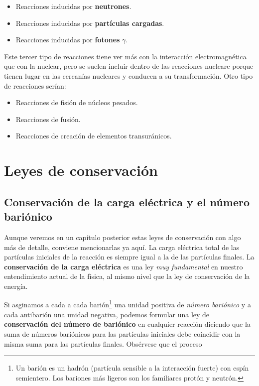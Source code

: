 \begin{itemize}
	\item Reacciones inducidas por \textbf{neutrones}.
	\item Reacciones inducidas por \textbf{partículas cargadas}.
	\item Reacciones inducidas por \textbf{fotones} $\gamma$.	
\end{itemize}
Este tercer tipo de reacciones tiene ver más con la interacción electromagnética que con la nuclear, pero se suelen incluir dentro de las reacciones nucleare porque tienen lugar en las cercanías nucleares y conducen a su transformación. Otro tipo de reacciones serían:

\begin{itemize}
	\item Reacciones de fisión de núcleos pesados.
	\item Reacciones de fusión.
	\item Reacciones de creación de elementos transuránicos.
\end{itemize}

\section{Leyes de conservación}

\subsection{Conservación de la carga eléctrica y el número bariónico}

Aunque veremos en un capítulo posterior estas leyes de conservación con algo más de detalle, conviene mencionarlas ya aquí. La carga eléctrica total de las partículas iniciales de la reacción es siempre igual a la de las partículas finales. La \textbf{conservación de la carga eléctrica} es una ley \textit{muy fundamental} en nuestro entendimiento actual de la física, al mismo nivel que la ley de conservación de la energía.


Si asginamos a cada a cada barión\footnote{Un barión es un hadrón (partícula sensible a la interacción fuerte) con espín semientero. Los bariones más ligeros son los familiares protón y neutrón.} una unidad positiva de \textit{número bariónico} y a cada antibarión una unidad negativa, podemos formular una ley de \textbf{conservación del número de bariónico} en cualquier reacción diciendo que la suma de números bariónicos para las partículas iniciales debe coincidir con la misma suma para las partículas finales. Obsérvese que el proceso 
 
